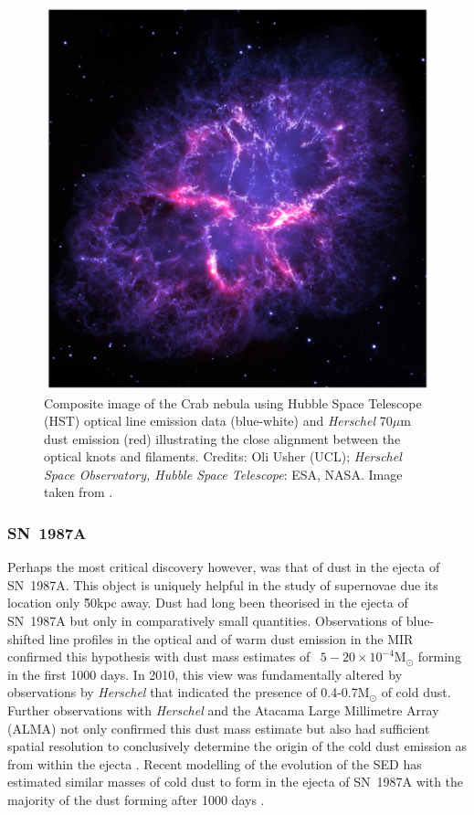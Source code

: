  \begin{figure}
\centering
\includegraphics[clip=true,scale=0.3,trim= 0 0 0 0]{chapters/chapter1/figs/Crab.png}
\caption{Composite image of the Crab nebula using Hubble Space Telescope (HST) optical line emission data (blue-white) and {\em Herschel} 70$\mu$m dust emission (red) illustrating the close alignment between the optical knots and filaments.  Credits: Oli Usher (UCL); \textit{Herschel Space Observatory, Hubble Space Telescope}: ESA, NASA.  Image taken from \citet{Owen2015}.}
\label{fig:Crab}
\end{figure}
 
 \subsubsection{SN~1987A}
 
 Perhaps the most critical discovery however, was that of dust in the ejecta of SN~1987A.  This object is uniquely helpful in the study of supernovae due its location only \~50kpc away.  Dust had long been theorised in the ejecta of SN~1987A but only in comparatively small quantities.  Observations of blue-shifted line profiles in the optical and of warm dust emission in the MIR confirmed this hypothesis with dust mass estimates of ~$5-20 \times 10^{-4}$M$_{\odot}$ forming in the first 1000 days\citep{Lucy1989,Roche1989,Bouchet1991,Wooden1993,Ercolano2007}.  In 2010, this view was fundamentally altered by observations by \textit{Herschel} that indicated the presence of 0.4-0.7M$_{\odot}$ of cold dust.  Further observations with {\em Herschel} and the Atacama Large Millimetre Array (ALMA) not only confirmed this dust mass estimate but also had sufficient spatial resolution to conclusively determine the origin of the cold dust emission as from within the ejecta \citep{Matsuura2011,Indebetouw2014,Matsuura2015}.  Recent modelling of the evolution of the SED has estimated similar masses of cold dust to form in the ejecta of SN~1987A with the majority of the dust forming after 1000 days \citep{Wesson2015}.
 

